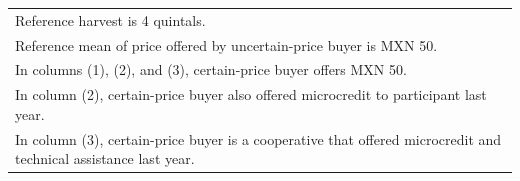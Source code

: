 \begin{table}[!htbp]
\begin{tabular}{@{\extracolsep{5pt}}lccc}
\multicolumn{4}{l}{Reference harvest is 4 quintals.} \\ 
\multicolumn{4}{l}{Reference mean of price offered by uncertain-price buyer is MXN 50.} \\ 
\multicolumn{4}{l}{In columns (1), (2), and (3), certain-price buyer offers MXN 50.} \\ 
\multicolumn{4}{l}{In column (2), certain-price buyer also offered microcredit to participant last year.} \\ 
\multicolumn{4}{l}{In column (3), certain-price buyer is a cooperative that offered microcredit and technical assistance last year.} \\ 
\end{tabular} 
\end{table} 
